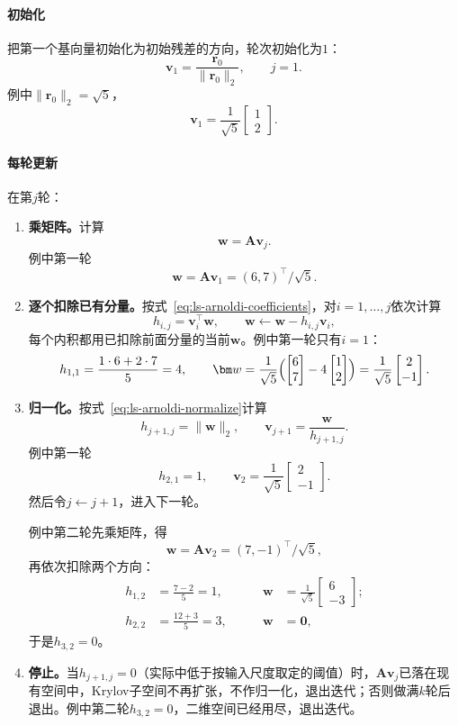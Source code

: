 \paragraph{初始化}
把第一个基向量初始化为初始残差的方向，轮次初始化为$1$：
\[
 \bm v_1=\frac{\bm r_0}{\lVert\bm r_0\rVert_2},\qquad j=1 .
\]
例中$\lVert\bm r_0\rVert_2=\sqrt5$，
\[
 \bm v_1=\frac1{\sqrt5}\begin{bmatrix}1\\2\end{bmatrix}.
\]

\paragraph{每轮更新}
在第$j$轮：
\begin{enumerate}
 \item \textbf{乘矩阵。}计算
 \[
  \bm w=\bm A\bm v_j .
 \]
 例中第一轮
 \[
  \bm w=\bm A\bm v_1=(6,7)^\top/\sqrt5 .
 \]

 \item \textbf{逐个扣除已有分量。}按式~\eqref{eq:ls-arnoldi-coefficients}，对$i=1,\ldots,j$依次计算
 \[
  h_{i,j}=\bm v_i^\top\bm w,\qquad \bm w\leftarrow\bm w-h_{i,j}\bm v_i ,
 \]
 每个内积都用已扣除前面分量的当前$\bm w$。例中第一轮只有$i=1$：
 \[
  h_{1,1}=\frac{1\cdot6+2\cdot7}{5}=4,\qquad
  \bm w=\frac1{\sqrt5}\Bigl(\begin{bmatrix}6\\7\end{bmatrix}-4\begin{bmatrix}1\\2\end{bmatrix}\Bigr)=\frac1{\sqrt5}\begin{bmatrix}2\\-1\end{bmatrix}.
 \]

 \item \textbf{归一化。}按式~\eqref{eq:ls-arnoldi-normalize}计算
 \[
  h_{j+1,j}=\lVert\bm w\rVert_2,\qquad \bm v_{j+1}=\frac{\bm w}{h_{j+1,j}} .
 \]
 例中第一轮
 \[
  h_{2,1}=1,\qquad \bm v_2=\frac1{\sqrt5}\begin{bmatrix}2\\-1\end{bmatrix}.
 \]
 然后令$j\leftarrow j+1$，进入下一轮。
 
 例中第二轮先乘矩阵，得
 \[
  \bm w=\bm A\bm v_2=(7,-1)^\top/\sqrt5 ,
 \]
 再依次扣除两个方向：
 \[
  \begin{aligned}
  h_{1,2}&=\frac{7-2}{5}=1,&\qquad \bm w&=\frac1{\sqrt5}\begin{bmatrix}6\\-3\end{bmatrix};\\
  h_{2,2}&=\frac{12+3}{5}=3,&\qquad \bm w&=\bm 0 ,
  \end{aligned}
 \]
 于是$h_{3,2}=0$。

 \item \textbf{停止。}当$h_{j+1,j}=0$（实际中低于按输入尺度取定的阈值）时，$\bm A\bm v_j$已落在现有空间中，Krylov子空间不再扩张，不作归一化，退出迭代；否则做满$k$轮后退出。例中第二轮$h_{3,2}=0$，二维空间已经用尽，退出迭代。
\end{enumerate}
